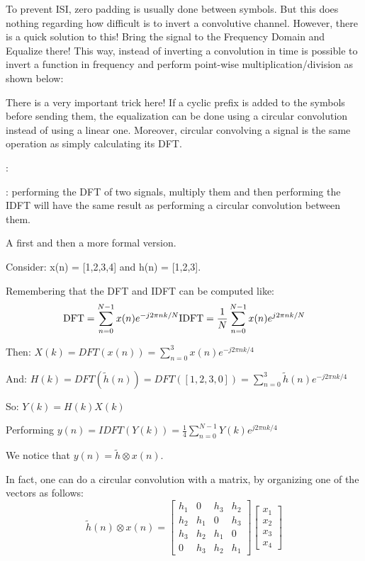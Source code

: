 \documentclass[12pt, a4paper]{article}
\begin{document}
To prevent ISI, zero padding is usually done between symbols. But this does nothing regarding how difficult is to invert a convolutive channel. However, there is a quick solution to this! Bring the signal to the Frequency Domain and Equalize there! This way, instead of inverting a convolution in time is possible to invert a function in frequency and perform point-wise multiplication/division as shown below:

\Vhrulefill

There is a very important trick here! If a cyclic prefix is added to the symbols before sending them, the equalization can be done using a circular convolution instead of using a linear one. Moreover, circular convolving a signal is the same operation as simply calculating its DFT. 


\Vhrulefill  {}: \Vhrulefill

: performing the DFT of two signals, multiply them and then performing the IDFT will have the same result as performing a circular convolution between them.


A  first and then a more formal version.

Consider: x(n) = [1,2,3,4] and h(n) = [1,2,3].

Remembering that the DFT and IDFT can be computed like:
\begin{equation}
    \text{DFT} = \sum_{n=0}^{N-1} x(n) e^{-j 2 \pi n k / N} \\
    \text{IDFT} = \frac{1}{N}\sum_{n=0}^{N-1} x(n) e^{j 2 \pi n k / N}
\end{equation}

Then: $X(k) = DFT(x(n)) = \sum_{n=0}^3 x(n) e^{-j 2 \pi n k / 4}$

And: $H(k) = DFT(\widetilde{h}(n)) = DFT([1,2,3,0]) = \sum_{n=0}^3 \widetilde{h}(n) e^{-j 2 \pi n k / 4}$

So: $Y(k) = H(k) X(k)$

Performing $y(n) = IDFT(Y(k)) = \frac{1}{4}\sum_{n=0}^{N-1} Y(k) e^{j 2 \pi n k / 4}$

We notice that $y(n) = \widetilde{h} \otimes x(n)$.

In fact, one can do a circular convolution with a matrix, by organizing one of the vectors as follows:
\begin{equation}\label{eq:circ_conv}
    \widetilde{h}(n) \otimes x(n) = 
    \begin{bmatrix}
        h_1 & 0 & h_3 & h_2 \\
        h_2 & h_1 & 0 & h_3 \\
        h_3 & h_2 & h_1 & 0 \\
        0 & h_3 & h_2 & h_1 
    \end{bmatrix}
    \begin{bmatrix}
        x_1 \\ x_2 \\ x_3 \\ x_4
    \end{bmatrix}
\end{equation}
\end{document}

